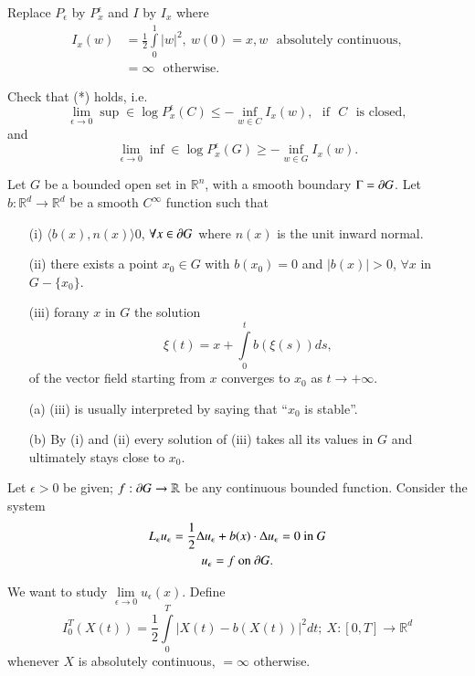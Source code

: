 \setcounter{exercise}{0}
\begin{exercise}\label{chap22-exer1}
Replace $P_{\epsilon}$ by $P^{\epsilon}_{x}$ and $I$ by $I_{x}$ where
\begin{align*}
I_{x}(w) &= \frac{1}{2}\int\limits^{1}_{0}|w|^{2},\ w(0)=x,w\text{~
  absolutely continuous},\\
&= \infty \text{~ otherwise.}
\end{align*}

Check that (*) holds, i.e.
$$
\lim\limits_{\epsilon\to 0}\sup \in \log P^{\epsilon}_{x}(C)\leq
-\inf\limits_{w\in C}I_{x}(w),\text{~ if~ } C\text{~ is closed},
$$
and
$$
\lim\limits_{\epsilon\to 0}\inf \in \log P^{\epsilon}_{x}(G)\geq
-\inf\limits_{w\in G}I_{x}(w).
$$

Let $G$ be a bounded open set in $\mathbb{R}^{n}$, with a smooth
boundary $\Gamma=\partial G$. Let $b:\mathbb{R}^{d}\to \mathbb{R}^{d}$
be a smooth $C^{\infty}$ function such that
\begin{itemize}
\item[(i)] $\langle b(x),n(x)\rangle 0$, $\forall x\in \partial G$ where
  $n(x)$ is the unit inward normal.

\item[(ii)] there exists a point $x_{0}\in G$ with $b(x_{0})=0$ and
  $|b(x)|>0$, $\forall x$ in $G-\{x_{0}\}$.

\item[(iii)] for\pageoriginale any $x$ in $G$ the solution
$$
\xi(t)=x+\int\limits^{t}_{0}b(\xi(s))ds,
$$
of the vector field starting from $x$ converges to $x_{0}$ as $t\to
+\infty$. 
\end{itemize}
\end{exercise}

\begin{remark*}
\begin{itemize}
\item[(a)] (iii) is usually interpreted by saying that ``$x_{0}$ is
  stable''.

\item[(b)] By (i) and (ii) every solution of (iii) takes all its
  values in $G$ and ultimately stays close to $x_{0}$.
\end{itemize}

Let $\epsilon>0$ be given; $f:\partial G\to \mathbb{R}$ be any continuous
bounded function. Consider the system
\begin{gather*}
L_{\epsilon}u_{\epsilon}=\frac{1}{2}\Delta u_{\epsilon}+b(x)\cdot
\Delta u_{\epsilon}=0\text{~ in~ }G\\
u_{\epsilon}=f\text{~ on~ } \partial G.
\end{gather*}

We want to study $\lim\limits_{\epsilon\to 0}u_{\epsilon}(x)$. Define
$$
I^{T}_{0}(X(t))=\frac{1}{2}\int\limits^{T}_{0}|X(t)-b(X(t))|^{2}dt;\ X:[0,T]\to
\mathbb{R}^{d} 
$$
whenever $X$ is absolutely continuous, $=\infty$ otherwise.
\end{remark*}


